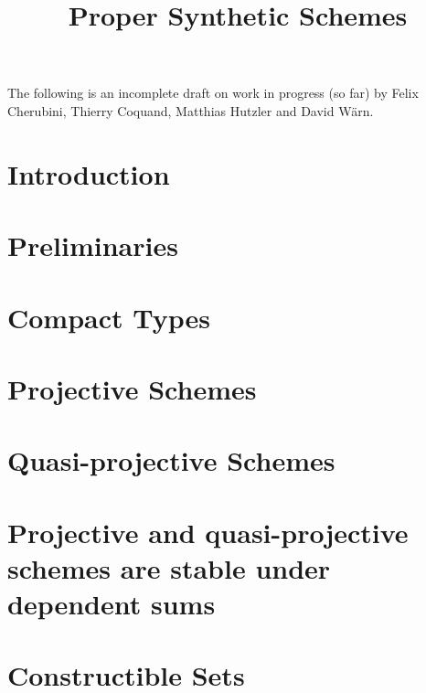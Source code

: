 \documentclass{../util/zariski}
\title{Proper Synthetic Schemes}
\begin{document}
\maketitle

The following is an incomplete draft on work in progress (so far)
by Felix Cherubini, Thierry Coquand, Matthias Hutzler and David Wärn.

\tableofcontents


\section*{Introduction}


\section{Preliminaries}


\section{Compact Types}


\section{Projective Schemes}


\section{Quasi-projective Schemes}


\section{Projective and quasi-projective schemes are stable under dependent sums}


\section{Constructible Sets}


\printindex

\printbibliography
\end{document}
